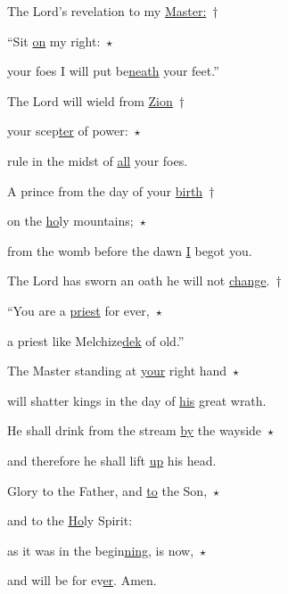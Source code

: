 
\noindent The Lord’s revelation to my \uline{Master:}~†~\nopagebreak

“Sit \uline{on} my right:~$\star$~\nopagebreak

your foes I will put be\uline{neath} your feet.”

\noindent The Lord will wield from \uline{Zion}~†~\nopagebreak

your scep\uline{ter} of power:~$\star$~\nopagebreak

rule in the midst of \uline{all} your foes.

\noindent A prince from the day of your \uline{birth}~†~\nopagebreak

on the \uline{ho}ly mountains;~$\star$~\nopagebreak

from the womb before the dawn \uline{I} begot you.

\noindent The Lord has sworn an oath he will not \uline{change}.~†~\nopagebreak

“You are a \uline{priest} for ever,~$\star$~\nopagebreak

a priest like Melchize\uline{dek} of old.”

\noindent The Master standing at \uline{your} right hand~$\star$~\nopagebreak

will shatter kings in the day of \uline{his} great wrath.

\noindent He shall drink from the stream \uline{by} the wayside~$\star$~\nopagebreak

and therefore he shall lift \uline{up} his head.

\noindent Glory to the Father, and \uline{to} the Son,~$\star$~\nopagebreak

and to the \uline{Ho}ly Spirit:

\noindent as it was in the begin\uline{ning}, is now,~$\star$~\nopagebreak

and will be for ev\uline{er}. Amen.
